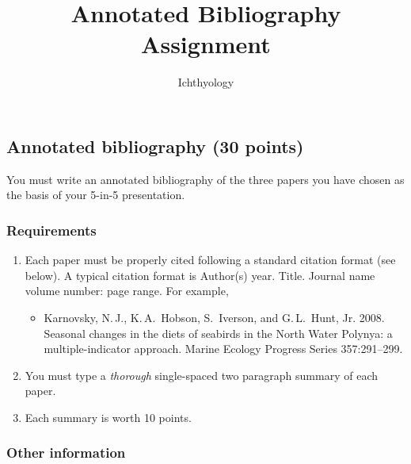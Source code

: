 \documentclass[12pt]{article}
\title{Annotated Bibliography Assignment}
\author{Ichthyology}
\date{}                                           %
\begin{document}
\thispagestyle{plain}


\subsection*{Annotated bibliography (30 points)}

You must write an annotated bibliography of the three papers you have chosen as the basis of your 5-in-5 presentation.

\subsubsection*{Requirements}

\begin{enumerate}[leftmargin=*]

\item Each paper must be properly cited following a standard citation format (see below).  A typical citation format is Author(s) year. Title. Journal name volume number: page range. For example,

\begin{itemize}[label={}, leftmargin=1.5em, itemindent=-1.5em]
\item Karnovsky, N.\,J., K.\,A.~Hobson, S.~Iverson, and G.\,L.~Hunt, Jr. 2008. Seasonal changes in the diets of seabirds in the North Water Polynya: a multiple-indicator approach. Marine Ecology Progress Series 357:291–299.

\end{itemize}


\item You must type a \emph{thorough} single-spaced two paragraph summary of each paper. %

\item Each summary is worth 10 points. 

\end{enumerate}

\subsubsection*{Other information}
\end{document}
